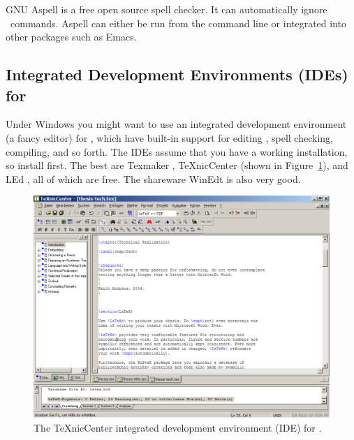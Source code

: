GNU Aspell \citep{Aspell} is a free open source spell checker.  It can
automatically ignore \LaTeXe\ commands. Aspell can either be run from
the command line or integrated into other packages such as Emacs.





\subsection{Integrated Development Environments (IDEs) for \protect\LaTeXe}

Under Windows you might want to use an integrated development
environment (a fancy editor) for \LaTeXe, which have built-in support
for editing \LaTeXe, spell checking, compiling, and so forth.
The IDEs assume that you have a working \LaTeXe installation,
so install \LaTeXe first.
%
The best are Texmaker \citep{texmaker}, TeXnicCenter
\citep{TeXnicCenter} (shown in Figure~\ref{fig:TeXnicCenter}), and LEd
\citep{LEd}, all of which are free. The shareware WinEdt
\citep{WinEdt} is also very good.


\begin{figure}[tp]
\centering
\includegraphics[keepaspectratio,width=\hsize,height=\halfh]
{images/texnic.png}

\caption[The TeXnicCenter IDE]{
The TeXnicCenter \citep{TeXnicCenter} integrated development
environment (IDE) for \LaTeXe.
}
\label{fig:TeXnicCenter}
\end{figure}








